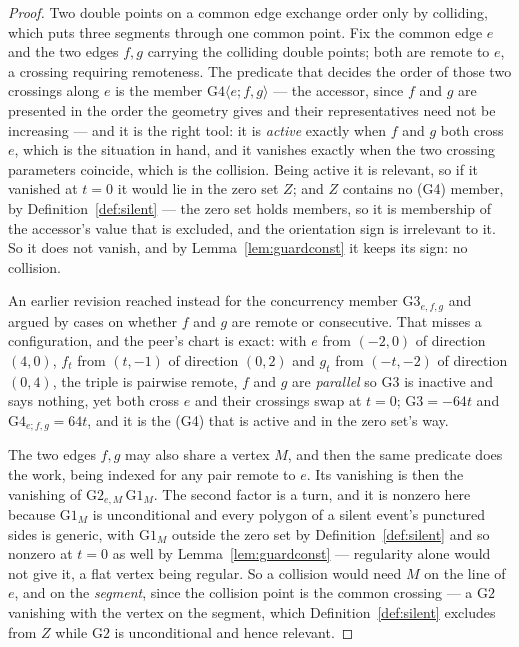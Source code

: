 \begin{proof}
Two double points on a common edge exchange order only by colliding, which puts
three segments through one common point. Fix the common edge $e$ and the two edges $f,g$ carrying the colliding double
points; both are remote to $e$, a crossing requiring remoteness. The predicate
that decides the order of those two crossings along $e$ is the member
$\mathrm{G4}\langle e;f,g\rangle$ --- the accessor, since $f$ and $g$ are
presented in the order the geometry gives and their representatives need not be
increasing --- and it is the right tool: it is \emph{active} exactly when $f$
and $g$ both cross $e$, which is the situation in hand, and it vanishes exactly
when the two crossing parameters coincide, which is the collision. Being active
it is relevant, so if it vanished at $t=0$ it would lie in the zero set $Z$;
and $Z$ contains no (G4) member, by Definition~\ref{def:silent} --- the zero
set holds members, so it is membership of the accessor's value that is
excluded, and the orientation sign is irrelevant to it. So it does not
vanish, and by Lemma~\ref{lem:guardconst} it keeps its sign: no collision.

An earlier revision reached instead for the concurrency member
$\mathrm{G3}_{e,f,g}$ and argued by cases on whether $f$ and $g$ are remote or
consecutive. That misses a configuration, and the peer's chart is exact: with
$e$ from $(-2,0)$ of direction $(4,0)$, $f_t$ from $(t,-1)$ of direction
$(0,2)$ and $g_t$ from $(-t,-2)$ of direction $(0,4)$, the triple is pairwise
remote, $f$ and $g$ are \emph{parallel} so $\mathrm{G3}$ is inactive and says
nothing, yet both cross $e$ and their crossings swap at $t=0$;
$\mathrm{G3}=-64t$ and $\mathrm{G4}_{e;f,g}=64t$, and it is the (G4) that is
active and in the zero set's way.

The two edges $f,g$ may also share a vertex $M$, and then the same predicate
does the work, being indexed for any pair remote to $e$. Its vanishing is then
the vanishing of $\mathrm{G2}_{e,M}\,\mathrm{G1}_M$. The second factor is a
turn, and it is nonzero here because $\mathrm{G1}_M$ is unconditional and every
polygon of a silent event's punctured sides is generic, with $\mathrm{G1}_M$
outside the zero set by Definition~\ref{def:silent} and so nonzero at $t=0$ as
well by Lemma~\ref{lem:guardconst} --- regularity alone would not give it, a
flat vertex being regular. So a collision would need $M$ on the line of $e$, and
on the \emph{segment}, since the collision point is the common crossing
--- a $\mathrm{G2}$ vanishing with the vertex on the segment, which
Definition~\ref{def:silent} excludes from $Z$ while $\mathrm{G2}$ is
unconditional and hence relevant.


\end{proof}
